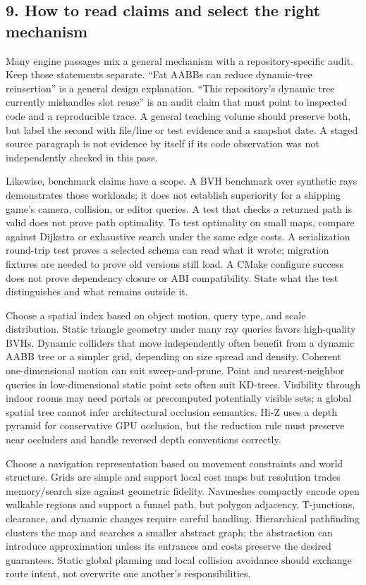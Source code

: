 \subsection{9. How to read claims and select the right mechanism}\label{05-engine-i-ch008-how-to-read-claims-and-select-the-right-mechanism}

Many engine passages mix a general mechanism with a repository-specific audit. Keep those statements separate. ``Fat AABBs can reduce dynamic-tree reinsertion'' is a general design explanation. ``This repository's dynamic tree currently mishandles slot reuse'' is an audit claim that must point to inspected code and a reproducible trace. A general teaching volume should preserve both, but label the second with file/line or test evidence and a snapshot date. A staged source paragraph is not evidence by itself if its code observation was not independently checked in this pass.

Likewise, benchmark claims have a scope. A BVH benchmark over synthetic rays demonstrates those workloads; it does not establish superiority for a shipping game's camera, collision, or editor queries. A test that checks a returned path is valid does not prove path optimality. To test optimality on small maps, compare against Dijkstra or exhaustive search under the same edge costs. A serialization round-trip test proves a selected schema can read what it wrote; migration fixtures are needed to prove old versions still load. A CMake configure success does not prove dependency closure or ABI compatibility. State what the test distinguishes and what remains outside it.

Choose a spatial index based on object motion, query type, and scale distribution. Static triangle geometry under many ray queries favors high-quality BVHs. Dynamic colliders that move independently often benefit from a dynamic AABB tree or a simpler grid, depending on size spread and density. Coherent one-dimensional motion can suit sweep-and-prune. Point and nearest-neighbor queries in low-dimensional static point sets often suit KD-trees. Visibility through indoor rooms may need portals or precomputed potentially visible sets; a global spatial tree cannot infer architectural occlusion semantics. Hi-Z uses a depth pyramid for conservative GPU occlusion, but the reduction rule must preserve near occluders and handle reversed depth conventions correctly.

Choose a navigation representation based on movement constraints and world structure. Grids are simple and support local cost maps but resolution trades memory/search size against geometric fidelity. Navmeshes compactly encode open walkable regions and support a funnel path, but polygon adjacency, T-junctions, clearance, and dynamic changes require careful handling. Hierarchical pathfinding clusters the map and searches a smaller abstract graph; the abstraction can introduce approximation unless its entrances and costs preserve the desired guarantees. Static global planning and local collision avoidance should exchange route intent, not overwrite one another's responsibilities.

